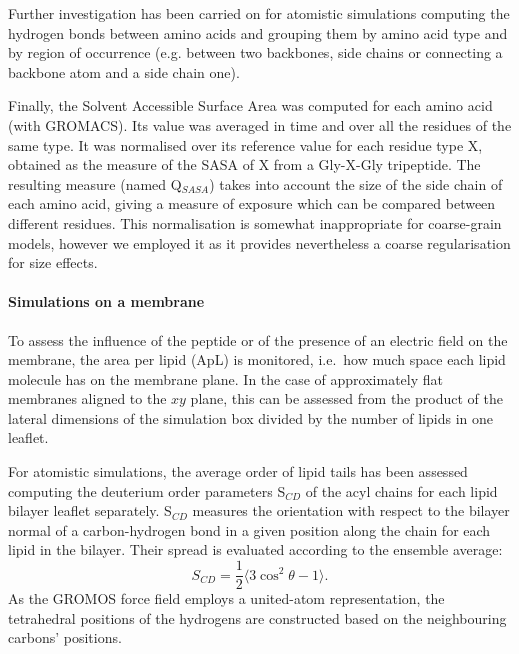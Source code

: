 Further investigation has been carried on for atomistic simulations computing the hydrogen bonds between amino acids and grouping them by amino acid type and by region of occurrence (e.g. between two backbones, side chains or connecting a backbone atom and a side chain one).

Finally, the Solvent Accessible Surface Area was computed for each amino acid (with GROMACS). Its value was averaged in time and over all the residues of the same type. It was normalised over its reference value for each residue type X, obtained as the measure of the SASA of X from a Gly-X-Gly tripeptide. The resulting measure (named Q$_{SASA}$) takes into account the size of the side chain of each amino acid, giving a measure of exposure which can be compared between different residues. 
%
This normalisation is somewhat inappropriate for coarse-grain models, however we employed it as it provides nevertheless a coarse regularisation for size effects.


\paragraph{Simulations on a membrane}
To assess the influence of the peptide or of the presence of an electric field on the membrane, the area per lipid (ApL) is monitored, i.e.\ how much space each lipid molecule has on the membrane plane. In the case of approximately flat membranes aligned to the $xy$ plane, this can be assessed from the product of the lateral dimensions of the simulation box divided by the number of lipids in one leaflet.

For atomistic simulations, the average order of lipid tails has been assessed computing the deuterium order parameters S$_{CD}$ of the acyl chains for each lipid bilayer leaflet separately. S$_{CD}$ measures the orientation with respect to the bilayer normal of a carbon-hydrogen bond in a given position along the chain for each lipid in the bilayer. Their spread is evaluated according to the ensemble average:
\begin{equation}
S_{CD} = \frac{1}{2} \langle 3\cos^2 \theta - 1 \rangle.
\end{equation}
As the GROMOS force field employs a united-atom representation, the tetrahedral positions of the hydrogens are constructed based on the neighbouring carbons’ positions.

